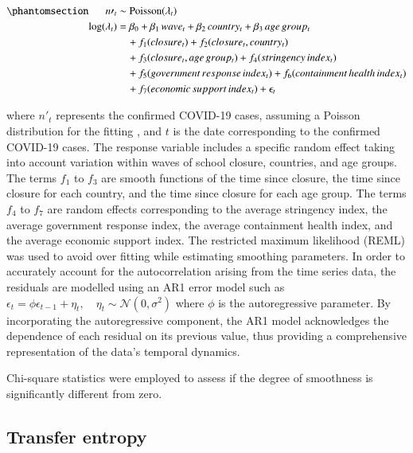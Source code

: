 \documentclass[
  number]{elsarticle}
\begin{document}
\begin{equation}\phantomsection\label{eq-gam}{
\begin{aligned}[t]
  n\prime_t &\sim \text{Poisson}(\lambda_t) \\
  \log(\lambda_t) &= \beta_0 + \beta_1\,wave_t + \beta_2\,country_t + \beta_3\,age\,group_t \\
  &\quad + f_1(closure_t) + f_2(closure_t, country_t) \\
  &\quad + f_3(closure_t, age\,group_t) + f_4(stringency\,index_t) \\
  &\quad + f_5(government\,response\,index_t) + f_6(containment\,health\,index_t) \\
  &\quad + f_7(economic\,support\,index_t) +\epsilon_t
\end{aligned}
}\end{equation}

\noindent where \(n\prime_t\) represents the confirmed COVID-19 cases,
assuming a Poisson distribution for the fitting \citep{loader2006local},
and \(t\) is the date corresponding to the confirmed COVID-19 cases. The
response variable includes a specific random effect taking into account
variation within waves of school closure, countries, and age groups. The
terms \(f_1\) to \(f_3\) are smooth functions of the time since closure,
the time since closure for each country, and the time since closure for
each age group. The terms \(f_4\) to \(f_7\) are random effects
corresponding to the average stringency index, the average government
response index, the average containment health index, and the average
economic support index. The restricted maximum likelihood (REML) was
used to avoid over fitting while estimating smoothing parameters. In
order to accurately account for the autocorrelation arising from the
time series data, the residuals are modelled using an AR1 error model
such as
\(\epsilon_t = \phi \epsilon_{t-1} + \eta_t, \quad \eta_t \sim \mathcal{N}(0, \sigma^2)\)
where \(\phi\) is the autoregressive parameter. By incorporating the
autoregressive component, the AR1 model acknowledges the dependence of
each residual on its previous value, thus providing a comprehensive
representation of the data's temporal dynamics.

Chi-square statistics were employed to assess if the degree of
smoothness is significantly different from zero.

\subsection{Transfer entropy}\label{transfer-entropy}
\end{document}
